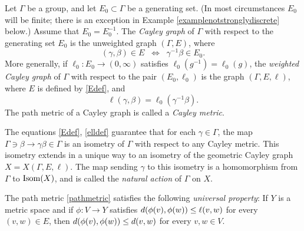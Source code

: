 \begin{example}
\label{examplecayleygraph}
Let $\Gamma$ be a group, and let $E_0\subset \Gamma$ be a generating set. (In most circumstances $E_0$ will be finite; there is an exception in Example \ref{examplenotstronglydiscrete} below.) Assume that $E_0 = E_0^{-1}$. The \emph{Cayley graph} of $\Gamma$ with respect to the generating set $E_0$ is the unweighted graph $(\Gamma,E)$, where
\begin{equation}
\label{Edef}
(\gamma,\beta)\in E \;\;\Leftrightarrow\;\; \gamma^{-1}\beta\in E_0.
\end{equation}
More generally, if $\ell_0:E_0\to (0,\infty)$ satisfies $\ell_0(g^{-1}) = \ell_0(g)$, the \emph{weighted Cayley graph} of $\Gamma$ with respect to the pair $(E_0,\ell_0)$ is the graph $(\Gamma,E,\ell)$, where $E$ is defined by \eqref{Edef}, and
\begin{equation}
\label{elldef}
\ell(\gamma,\beta) = \ell_0(\gamma^{-1}\beta).
\end{equation}
The path metric of a Cayley graph is called a \emph{Cayley metric}.
\end{example}

\begin{remark}
\label{remarknaturalaction}
The equations \eqref{Edef}, \eqref{elldef} guarantee that for each $\gamma\in\Gamma$, the map $\Gamma\ni\beta\to \gamma\beta\in\Gamma$ is an isometry of $\Gamma$ with respect to any Cayley metric. This isometry extends in a unique way to an isometry of the geometric Cayley graph $X = X(\Gamma,E,\ell)$. The map sending $\gamma$ to this isometry is a homomorphism from $\Gamma$ to $\operatorname{Isom}(X)$, and is called the \emph{natural action} of $\Gamma$ on $X$.
\end{remark}

\begin{remark}
\label{remarkpathmetricuniversal}
The path metric \eqref{pathmetric} satisfies the following \emph{universal property}: If $Y$ is a metric space and if $\phi:V\to Y$ satisfies $d(\phi(v),\phi(w)) \leq \ell(v,w)$ for every $(v,w)\in E$, then $d(\phi(v),\phi(w)) \leq d(v,w)$ for every $v,w\in V$.
\end{remark}

